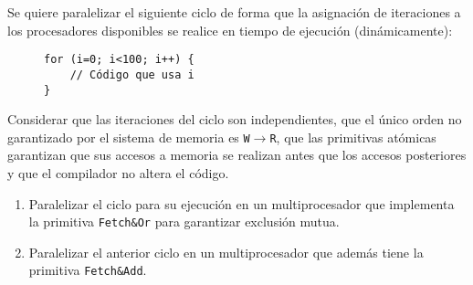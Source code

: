 \begin{ejercicio}
    Se quiere paralelizar el siguiente ciclo de forma que la asignación de iteraciones a los
    procesadores disponibles se realice en tiempo de ejecución (dinámicamente):
    \begin{figure}[H]
        \centering
        \begin{verbatim}
for (i=0; i<100; i++) {
    // Código que usa i
}
        \end{verbatim}
    \end{figure}
    \begin{observacion}
        Considerar que las iteraciones del ciclo son independientes, que el único orden no garantizado por el
        sistema de memoria es \verb|W|$\to$\verb|R|, que las primitivas atómicas garantizan que sus accesos a memoria se realizan
        antes que los accesos posteriores y que el compilador no altera el código.
    \end{observacion}
    \begin{enumerate}
        \item Paralelizar el ciclo para su ejecución en un multiprocesador que implementa la primitiva \verb|Fetch&Or|
        para garantizar exclusión mutua.
        \item Paralelizar el anterior ciclo en un multiprocesador que además tiene la primitiva \verb|Fetch&Add|.
    \end{enumerate}
\end{ejercicio}

